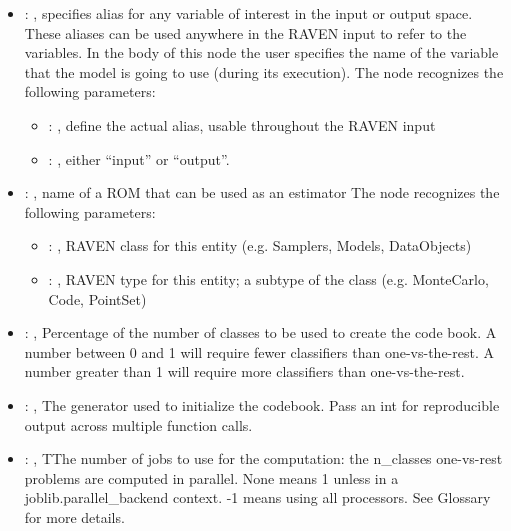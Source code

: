 \begin{itemize}
    \item {}: , 
      specifies alias for         any variable of interest in the input or output space. These
      aliases can be used anywhere in the RAVEN input to         refer to the variables. In the body
      of this node the user specifies the name of the variable that the model is going to use
      (during its execution).
      The  node recognizes the following parameters:
        \begin{itemize}
          \item {}: , 
            define the actual alias, usable throughout the RAVEN input
          \item {}: , 
            either ``input'' or ``output''.
      \end{itemize}

    \item {}: , 
      name of a ROM that can be used as an estimator
      The  node recognizes the following parameters:
        \begin{itemize}
          \item {}: , 
            RAVEN class for this entity (e.g. Samplers, Models, DataObjects)
          \item {}: , 
            RAVEN type for this entity; a subtype of the class (e.g. MonteCarlo, Code, PointSet)
      \end{itemize}

    \item {}: , 
      Percentage of the number of classes to be used to create
      the code book. A number between 0 and 1 will require fewer classifiers
      than one-vs-the-rest. A number greater than 1 will require more classifiers
      than one-vs-the-rest.

    \item {}: , 
      The generator used to initialize the codebook. Pass an int
      for reproducible output across multiple function calls.

    \item {}: , 
      TThe number of jobs to use for the computation: the n\_classes one-vs-rest
      problems are computed in parallel. None means 1 unless in a joblib.parallel\_backend
      context. -1 means using all processors. See Glossary for more details.
  \end{itemize}
